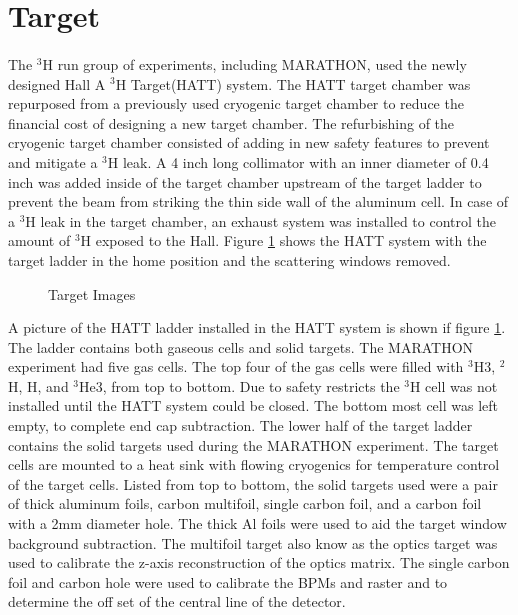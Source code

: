 \section{Target}\label{sec:target}
\paragraph{} The $^3$H run group of experiments, including MARATHON, used the newly designed Hall A $^3$H Target(HATT) system. The HATT target chamber was repurposed from a previously used cryogenic target chamber to reduce the financial cost of designing a new target chamber. The refurbishing of the cryogenic target chamber consisted of adding in new safety features to prevent and mitigate a $^3$H leak.  A 4 inch long collimator with an inner diameter of 0.4 inch was added inside of the target chamber upstream of the target ladder to prevent the beam from striking the thin side wall of the aluminum cell. In case of a $^3$H leak in the target chamber, an exhaust system was installed to control the amount of $^3$H exposed to the Hall.\cite{HATT_eng}  Figure \ref{HATT} shows the HATT system with the target ladder in the home position and the scattering windows removed. 
\begin{figure}[t]
	\centering
	\caption{Target Images}
	\hspace*{-20pt}
	\centering
	\label{HATT}


\end{figure}
A picture of the HATT ladder installed in the HATT system is shown if figure \ref{HATT}. The ladder contains both gaseous cells and solid targets. The MARATHON experiment had five gas cells. The top four of the gas cells were filled with $^3$H3, $^2$H, H, and $^3$He3, from top to bottom. Due to safety restricts the $^3$H cell was not installed until the HATT system could be closed. The bottom most cell was left empty, to complete end cap subtraction. The lower half of the target ladder contains the solid targets used during the MARATHON experiment. The target cells are mounted to a heat sink with flowing cryogenics for temperature control of the target cells. Listed from top to bottom, the solid targets used were a pair of thick aluminum foils, carbon multifoil, single carbon foil, and a carbon foil with a 2mm diameter hole. The thick Al foils were used to aid the target window background subtraction. The multifoil target also know as the optics target was used to calibrate the z-axis  reconstruction of the optics matrix. The single carbon foil and carbon hole were used to calibrate the BPMs and raster and to determine the off set of the central line of the detector. 

